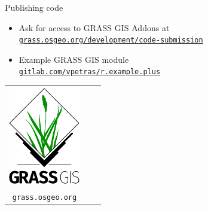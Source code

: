 \documentclass[xcolor={dvipsnames,usenames},beamer,aspectratio=169]{beamer}
\begin{document}
\begin{frame}{Publishing code}

\begin{block}{}
 \begin{itemize}
  \item Ask for access to GRASS GIS Addons at
        \\
        \href{https://grass.osgeo.org/development/code-submission/}{\texttt{grass.osgeo.org/development/code-submission}}
  \item Example GRASS GIS module
        \\
        \href{https://gitlab.com/vpetras/r.example.plus/}{\texttt{gitlab.com/vpetras/r.example.plus}}
 \end{itemize}
\end{block}

\bigskip
\centering

\begin{tabular}{clc}
\begin{minipage}{0.16\textwidth}
\includegraphics[width=\textwidth]{grass_gis}
\end{minipage}
&
\begin{minipage}{0.5\textwidth}
\footnotesize
\href{https://grass.osgeo.org}{%
Get GRASS GIS at\\
\texttt{grass.osgeo.org}%
}


\end{minipage}
\end{tabular}
\end{frame}
\end{document}
